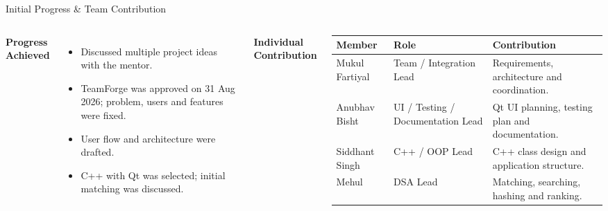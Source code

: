 \documentclass[aspectratio=169,11pt]{beamer}
\begin{document}
\begin{frame}{Initial Progress \& Team Contribution}
\footnotesize
\begin{columns}[T,totalwidth=\textwidth]
\textbf{\color{GEUBlue}Progress Achieved}
\begin{itemize}\setlength{\itemsep}{2pt}
\item Discussed multiple project ideas with the mentor.
\item TeamForge was approved on 31 Aug 2026; problem, users and features were fixed.
\item User flow and architecture were drafted.
\item C++ with Qt was selected; initial matching was discussed.
\end{itemize}
\textbf{\color{GEUBlue}Individual Contribution}
\vspace{2mm}
\tiny
\begin{tabularx}{\textwidth}{@{}p{1.5cm}p{1.9cm}X@{}}
\toprule
Member & Role & Contribution\\
\midrule
Mukul Fartiyal & Team / Integration Lead & Requirements, architecture and coordination.\\
Anubhav Bisht & UI / Testing / Documentation Lead & Qt UI planning, testing plan and documentation.\\
Siddhant Singh & C++ / OOP Lead & C++ class design and application structure.\\
Mehul & DSA Lead & Matching, searching, hashing and ranking.\\
\bottomrule
\end{tabularx}
\end{columns}
\end{frame}
\end{document}
